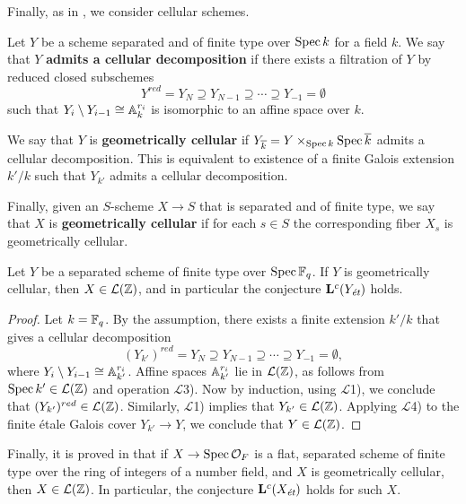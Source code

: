 \documentclass{article}
\numberwithin{equation}{section}
\begin{document}
Finally, as in \cite[\S 5.4]{Morin-2014}, we consider cellular schemes.

\begin{definition}
  Let $Y$ be a scheme separated and of finite type over $\Spec k$ for a field
  $k$. We say that $Y$ \textbf{admits a cellular decomposition} if there exists
  a filtration of $Y$ by reduced closed subschemes
  $$Y^{red} = Y_N \supseteq Y_{N-1} \supseteq \cdots \supseteq Y_{-1} = \emptyset$$
  such that $Y_i\setminus Y_{i-1} \cong \AA^{r_i}_k$ is isomorphic to an affine
  space over $k$.

  We say that $Y$ is \textbf{geometrically cellular} if
  $Y_{\overline{k}} = Y \times_{\Spec k} \Spec \overline{k}$ admits a cellular
  decomposition. This is equivalent to existence of a finite Galois extension
  $k'/k$ such that $Y_{k'}$ admits a cellular decomposition.

  Finally, given an $S$-scheme $X \to S$ that is separated and of finite type,
  we say that $X$ is \textbf{geometrically cellular} if for each $s \in S$ the
  corresponding fiber $X_s$ is geometrically cellular.
\end{definition}

\begin{proposition}
  Let $Y$ be a separated scheme of finite type over $\Spec \FF_q$.
  If $Y$ is geometrically cellular, then $X \in \mathcal{L} (\ZZ)$,
  and in particular the conjecture $\mathbf{L}^c (Y_\et)$ holds.

  \begin{proof}
    Let $k = \FF_q$. By the assumption, there exists a finite extension $k'/k$
    that gives a cellular decomposition
    $$(Y_{k'})^{red} = Y_N \supseteq Y_{N-1} \supseteq \cdots \supseteq Y_{-1} = \emptyset,$$
    where $Y_i \setminus Y_{i-1} \cong \AA^{r_i}_{k'}$. Affine spaces
    $\AA^{r_i}_{k'}$ lie in $\mathcal{L} (\ZZ)$, as follows from
    $\Spec k' \in \mathcal{L} (\ZZ)$ and operation $\mathcal{L}$3). Now by
    induction, using $\mathcal{L}$1), we conclude that
    $(Y_{k'})^{red} \in \mathcal{L} (\ZZ)$. Similarly, $\mathcal{L}$1) implies
    that $Y_{k'} \in \mathcal{L} (\ZZ)$. Applying $\mathcal{L}$4) to the finite
    étale Galois cover $Y_{k'} \to Y$, we conclude that
    $Y \in \mathcal{L} (\ZZ)$.
  \end{proof}
\end{proposition}

Finally, it is proved in \cite[Proposition~5.14]{Morin-2014} that if
$X \to \Spec \mathcal{O}_F$ is a flat, separated scheme of finite type over the
ring of integers of a number field, and $X$ is geometrically cellular, then
$X \in \mathcal{L} (\ZZ)$. In particular, the conjecture $\mathbf{L}^c (X_\et)$
holds for such $X$.
\end{document}
